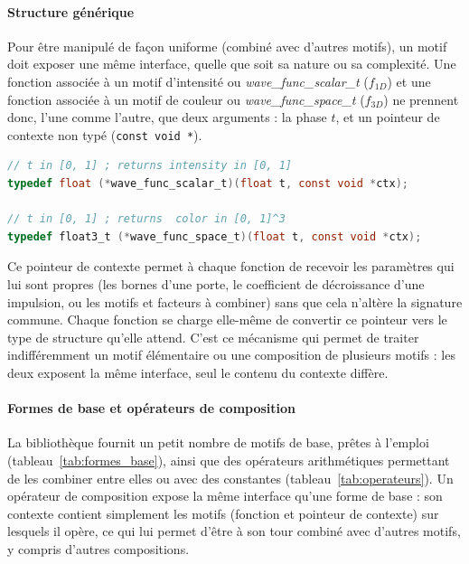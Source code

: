 \newpage

\paragraph*{Structure générique} Pour être manipulé de façon uniforme (combiné avec d'autres motifs), un motif doit exposer une
même interface, quelle que soit sa nature ou sa complexité. Une fonction associée à un motif d'intensité ou
\textit{wave\_func\_scalar\_t} ($f_{1D}$) et une fonction associée à un motif de couleur ou \textit{wave\_func\_space\_t}
($f_{3D}$) ne prennent donc, l'une comme l'autre, que deux arguments : la phase $t$, et un pointeur de contexte non typé
(\texttt{const void *}).\\

\begin{lstlisting}[language=C, frame=tb, basicstyle=\small]
// t in [0, 1] ; returns intensity in [0, 1]
typedef float (*wave_func_scalar_t)(float t, const void *ctx);

// t in [0, 1] ; returns  color in [0, 1]^3
typedef float3_t (*wave_func_space_t)(float t, const void *ctx);
\end{lstlisting}

Ce pointeur de contexte permet à chaque fonction de recevoir les paramètres qui lui sont propres (les bornes d'une porte, le
coefficient de décroissance d'une impulsion, ou les motifs et facteurs à combiner) sans que cela n'altère la signature commune.
Chaque fonction se charge elle-même de convertir ce pointeur vers le type de structure qu'elle attend. C'est ce mécanisme qui
permet de traiter indifféremment un motif élémentaire ou une composition de plusieurs motifs : les deux exposent la même
interface, seul le contenu du contexte diffère.

\paragraph*{Formes de base et opérateurs de composition} La bibliothèque fournit un petit nombre de motifs de base, prêtes à
l'emploi (tableau~\ref{tab:formes_base}), ainsi que des opérateurs arithmétiques permettant de les combiner entre elles ou avec
des constantes (tableau~\ref{tab:operateurs}). Un opérateur de composition expose la même interface qu'une forme de base : son
contexte contient simplement les motifs (fonction et pointeur de contexte) sur lesquels il opère, ce qui lui permet d'être à
son tour combiné avec d'autres motifs, y compris d'autres compositions.\\


